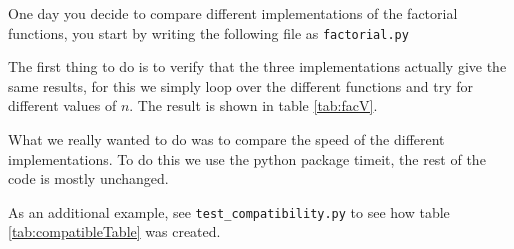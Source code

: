 One day you decide to compare different implementations of the
factorial functions, you start by writing the following file
as \verb!factorial.py!


The first thing to do is to verify that the three implementations actually give
the same results, for this we simply loop over the different functions and try for
different values of $n$. The result is shown in table \ref{tab:facV}.



What we really wanted to do was to
compare the speed of the different implementations. To do this
we use the python package timeit, the rest of the code is mostly unchanged.



As an additional example, see \verb!test_compatibility.py! to see how table \ref{tab:compatibleTable}
was created.
